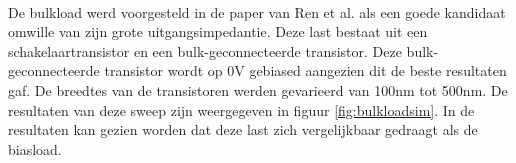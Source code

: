 \paragraph{}
De bulkload werd voorgesteld in de paper van Ren et al. \cite{bulkload} als een goede kandidaat omwille van zijn grote uitgangsimpedantie. Deze last bestaat uit een schakelaartransistor en een bulk-geconnecteerde transistor. Deze bulk-geconnecteerde transistor wordt op 0V gebiased aangezien dit de beste resultaten gaf. De breedtes van de transistoren werden gevarieerd van 100nm tot 500nm. De resultaten van deze sweep zijn weergegeven in figuur \ref{fig:bulkloadsim}. In de resultaten kan gezien worden dat deze last zich vergelijkbaar gedraagt als de biasload.

